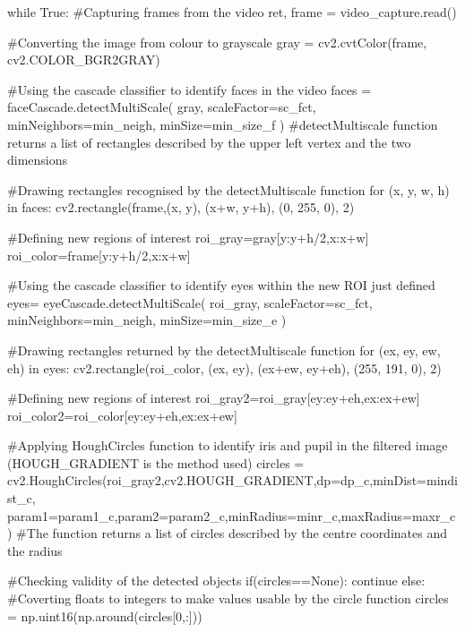 \documentclass[12pt]{article}
\begin{document}
{\begin{codice}
while True:
    #Capturing frames from the video
    ret, frame = video_capture.read()
    
    #Converting the image from colour to grayscale
    gray = cv2.cvtColor(frame, cv2.COLOR_BGR2GRAY)
    
    #Using the cascade classifier to identify faces in the video
    faces = faceCascade.detectMultiScale(       
        gray,
        scaleFactor=sc_fct,
        minNeighbors=min_neigh,
        minSize=min_size_f
        )
    #detectMultiscale function returns a list of rectangles described by the upper left vertex and the two dimensions

    #Drawing rectangles recognised by the detectMultiscale function
    for (x, y, w, h) in faces:
            cv2.rectangle(frame,(x, y), (x+w, y+h), (0, 255, 0), 2)
            
            #Defining new regions of interest
            roi_gray=gray[y:y+h/2,x:x+w]
            roi_color=frame[y:y+h/2,x:x+w]
        
        #Using the cascade classifier to identify eyes within the new ROI just defined
            eyes= eyeCascade.detectMultiScale(         
                 roi_gray,
                 scaleFactor=sc_fct,
                 minNeighbors=min_neigh,
                 minSize=min_size_e
                 )


            #Drawing rectangles returned by the detectMultiscale function
            for (ex, ey, ew, eh) in eyes:
                cv2.rectangle(roi_color, (ex, ey), (ex+ew, ey+eh), (255, 191, 0), 2)
            
                #Defining new regions of interest 
                roi_gray2=roi_gray[ey:ey+eh,ex:ex+ew]
                roi_color2=roi_color[ey:ey+eh,ex:ex+ew]
                
                #Applying HoughCircles function to identify iris and pupil in the filtered image (HOUGH_GRADIENT is the method used)
                circles = cv2.HoughCircles(roi_gray2,cv2.HOUGH_GRADIENT,dp=dp_c,minDist=mindist_c,
                            param1=param1_c,param2=param2_c,minRadius=minr_c,maxRadius=maxr_c)
                #The function returns a list of circles described by the centre coordinates and the radius
                    
                #Checking validity of the detected objects    
                if(circles==None):
                    continue
                else:
                #Coverting floats to integers to make values usable by the circle function
                  circles = np.uint16(np.around(circles[0,:]))
            

\end{codice}}
\end{document}
